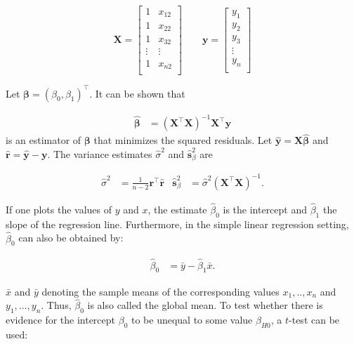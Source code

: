 \documentclass[11pt,a4paper,twoside]{book}\usepackage[]{graphicx}\usepackage[]{color}
\begin{document}
\begin{equation*}
\mathbf{X} = 
\begin{bmatrix}
1 & x_{12} \\
1 & x_{22} \\
1 & x_{32} \\
\vdots & \vdots \\
1 & x_{n2} \\
\end{bmatrix} 
\qquad
\mathbf{y} = 
\begin{bmatrix}
y_1 \\
y_2 \\
y_3 \\
\vdots \\
y_n \\
\end{bmatrix}
\end{equation*}

\vspace{2mm}

Let $\boldsymbol{\beta} = (\beta_0, \beta_1)^\top$. It can be shown that 

\begin{align}
\hat{\boldsymbol{\beta}} &= (\mathbf{X}^\top \mathbf{X})^{-1} \mathbf{X}^\top \mathbf{y} \label{eq:regression.parameters}
\end{align}
is an estimator of $\boldsymbol{\beta}$ that minimizes the squared residuals. Let $\hat{\mathbf{y}} = \mathbf{X}\hat{\boldsymbol{\beta}}$ and $\hat{\mathbf{r}} = \hat{\mathbf{y}} - \mathbf{y}$. The variance estimates $\hat{\sigma}^2$ and $\hat{\mathbf{s}}_\beta^2$ are

\begin{align}
\hat{\sigma}^2 &= \frac{1}{n-2}\mathbf{r}^\top \hat{\mathbf{r}} & \hat{\mathbf{s}}_\beta^2 &= \hat{\sigma}^2 (\mathbf{X}^\top \mathbf{X})^{-1}. \label{eq:regression.variances}
\end{align}

If one plots the values of $y$ and $x$, the estimate $\hat{\beta}_0$ is the intercept and $\hat{\beta}_1$ the slope of the regression line. Furthermore, in the simple linear regression setting, $\hat{\beta}_0$ can also be obtained by:

\begin{align}
\hat{\beta}_0 &= \bar{y} - \hat{\beta}_1 \bar{x}. \nonumber
\end{align}

$\bar{x}$ and $\bar{y}$ denoting the sample means of the corresponding values $x_1, .., x_n$ and $y_1, ..., y_n$. Thus, $\hat{\beta}_0$ is also called the global mean.
To test whether there is evidence for the intercept $\beta_0$ to be unequal to some value $\beta_{H0}$, a $t$-test can be used:
\end{document}
